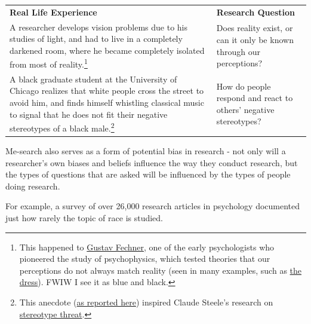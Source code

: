 \documentclass[
  letterpaper,
  DIV=11,
  numbers=noendperiod,
  oneside]{scrreprt}
\begin{document}
\begin{longtable}[]{@{}
  >{\raggedright\arraybackslash}p{}
  >{\raggedright\arraybackslash}p{}@{}}
\toprule\noalign{}
\endhead
\bottomrule\noalign{}
\endlastfoot
\textbf{Real Life Experience} & \textbf{Research Question} \\
A researcher develops vision problems due to his studies of light, and
had to live in a completely darkened room, where he became completely
isolated from most of reality.\footnote{This happened to
  \href{https://plato.stanford.edu/entries/fechner/}{Gustav Fechner},
  one of the early psychologists who pioneered the study of
  psychophysics, which tested theories that our perceptions do not
  always match reality (seen in many examples, such as
  \href{https://www.rit.edu/news/color-scientists-explain-dress-went-viral}{the
  dress}). FWIW I see it as blue and black.} & Does reality exist, or
can it only be known through our perceptions? \\
A black graduate student at the University of Chicago realizes that
white people cross the street to avoid him, and finds himself whistling
classical music to signal that he does not fit their negative
stereotypes of a black male.\footnote{This anecdote
  (\href{https://www.npr.org/2010/04/12/125859207/whistling-vivaldi-and-beating-stereotypes}{as
  reported here}) inspired Claude Steele's research on
  \href{https://en.wikipedia.org/wiki/Stereotype_threat}{stereotype
  threat}.} & How do people respond and react to others' negative
stereotypes? \\
\end{longtable}

Me-search also serves as a form of potential bias in research - not only
will a researcher's own biases and beliefs influence the way they
conduct research, but the types of questions that are asked will be
influenced by the types of people doing research.

For example, a survey of over 26,000 research articles in psychology
documented just how rarely the topic of race is studied.
\end{document}
